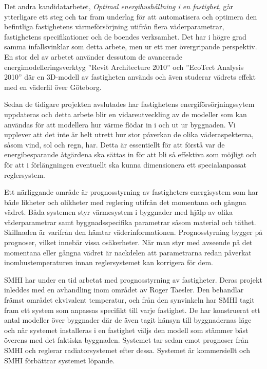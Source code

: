 Det andra kandidatarbetet, \textit{Optimal energihushållning i en fastighet}\cite{kandidatarbete2010},
går ytterligare ett steg och tar fram underlag för att automatisera och
optimera den befintliga fastighetens värmeförsörjning utifrån
flera väderparametrar, fastighetens specifikationer och de boendes verksamhet. Det har i högre grad samma infallsvinklar som detta arbete, men ur ett mer övergripande perspektiv. En stor del av arbetet använder dessutom de avancerade energimodelleringsverktyg ''Revit Architecture 2010'' och 
''EcoTect Analysis 2010'' där en 3D-modell av fastigheten används och även studerar vädrets effekt med en väderfil över Göteborg.

Sedan de tidigare projekten avslutades har fastighetens energiförsörjningssytem uppdateras och detta arbete blir en vidareutveckling av de modeller som kan användas för att modellera hur värme flödar in i och ut ur byggnaden. Vi upplever att det inte är helt utrett hur stor påverkan de olika väderaspekterna, såsom vind, sol och regn, har. Detta är essentiellt för att förstå var de energibesparande åtgärdena ska sättas in för att bli så effektiva som möjligt och för att i förlängningen eventuellt ska kunna dimensionera ett specialanpassat reglersystem.

Ett närliggande område är prognosstyrning av fastigheters energisystem som har både likheter och olikheter med reglering utifrån det momentana och gångna vädret. Båda systemen styr värmesystem i byggnader med hjälp av olika väderparametrar samt byggnadsspecifika parametrar såsom material och täthet. Skillnaden är varifrån den hämtar väderinformationen. Prognosstyrning bygger på prognoser, vilket innebär vissa osäkerheter. När man styr med avseende på det momentana eller gångna vädret är nackdelen att parametrarna redan påverkat inomhustemperaturen innan reglersystemet kan korrigera för dem.

SMHI har under en tid arbetat med prognosstyrning av fastigheter. Deras projekt inleddes med en avhandling inom området av Roger Taesler. Den behandlar främst området ekvivalent temperatur, och från den synvinkeln har SMHI tagit fram ett system som anpassas specifikt till varje fastighet. De har konstruerat ett antal modeller över byggnader där de även tagit hänsyn till byggnadernas läge och när systemet installeras i en fastighet väljs den modell som stämmer bäst överens med det faktiska byggnaden. Systemet tar sedan emot prognoser från SMHI och reglerar radiatorsystemet efter dessa. Systemet är kommersiellt och SMHI förbättrar systemet löpande.






